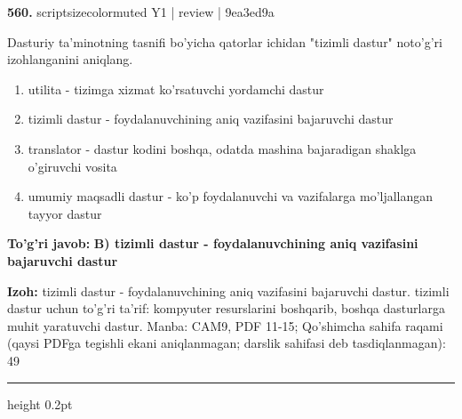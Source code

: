 \documentclass[10pt,a4paper]{article}
\begin{document}
{\bfseries\sffamily\color{ink} 560.} {scriptsizecolor{muted} Y1 | review | 9ea3ed9a}
\par
Dasturiy ta'minotning tasnifi bo'yicha qatorlar ichidan "tizimli dastur" noto'g'ri izohlanganini aniqlang.
\begin{enumerate}[label=\Alph*),leftmargin=9mm]
\item utilita - tizimga xizmat ko'rsatuvchi yordamchi dastur
\item tizimli dastur - foydalanuvchining aniq vazifasini bajaruvchi dastur
\item translator - dastur kodini boshqa, odatda mashina bajaradigan shaklga o'giruvchi vosita
\item umumiy maqsadli dastur - ko'p foydalanuvchi va vazifalarga mo'ljallangan tayyor dastur
\end{enumerate}
\begin{tcolorbox}[enhanced,breakable,colback=teal!4,colframe=teal!60!black,boxrule=0.45pt,arc=1.2mm,left=2.7mm,right=2.7mm,top=1.8mm,bottom=1.8mm,before skip=2mm,after skip=2mm]
{\bfseries\sffamily\color{teal}To'g'ri javob:} \textbf{B) tizimli dastur - foydalanuvchining aniq vazifasini bajaruvchi dastur}
\par\smallskip
{\bfseries Izoh:} tizimli dastur - foydalanuvchining aniq vazifasini bajaruvchi dastur. tizimli dastur uchun to'g'ri ta'rif: kompyuter resurslarini boshqarib, boshqa dasturlarga muhit yaratuvchi dastur. Manba: CAM9, PDF 11-15; Qo'shimcha sahifa raqami (qaysi PDFga tegishli ekani aniqlanmagan; darslik sahifasi deb tasdiqlanmagan): 49
\end{tcolorbox}
\vspace{2mm}\hrule height 0.2pt\vspace{3mm}
\end{document}
